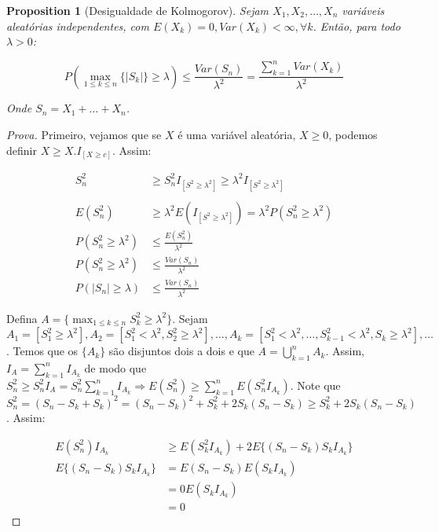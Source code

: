 \documentclass[
]{article}
\newtheorem{proposition}{Proposition}[section]
\theoremstyle{definition}
\theoremstyle{definition}
\theoremstyle{definition}
\theoremstyle{definition}
\theoremstyle{remark}
\begin{document}
\begin{proposition}[Desigualdade de Kolmogorov]
Sejam \(X_{1},X_{2},\ldots,X_{n}\) variáveis aleatórias independentes, com \(E(X_{k}) = 0, Var(X_{k}) < \infty, \forall k\). Então, para todo \(\lambda > 0\):

\begin{equation*}
P\left(\max_{1 \le k \le n}\{|S_{k}|\} \ge \lambda\right) \le \frac{Var(S_{n})}{\lambda^{2}} = \frac{\sum_{k=1}^{n}Var(X_{k})}{\lambda^{2}}
\end{equation*}

Onde \(S_{n} = X_{1} + \ldots + X_{n}\).
\end{proposition}

\begin{proof}[Prova]
Primeiro, vejamos que se \(X\) é uma variável aleatória, \(X \ge 0\), podemos definir \(X \ge X.I_{[X \ge c]}\). Assim:

\begin{align*}
S_{n}^{2} &\ge S_{n}^{2}I_{[S^{2} \ge \lambda^{2}]} \ge \lambda^{2}I_{[S^{2} \ge \lambda^{2}]} \\ \\
E(S_{n}^{2}) &\ge \lambda^{2}E(I_{[S^{2} \ge \lambda^{2}]}) = \lambda^{2}P(S_{n}^{2} \ge \lambda^{2}) \\
P(S_{n}^{2} \ge \lambda^{2}) &\le \frac{E(S_{n}^{2})}{\lambda^{2}} \\
P(S_{n}^{2} \ge \lambda^{2}) &\le \frac{Var(S_{n})}{\lambda^{2}} \\
P(|S_{n}| \ge \lambda) &\le \frac{Var(S_{n})}{\lambda^{2}}
\end{align*}

Defina \(A = \{\max_{1 \le k \le n}S_{k}^{2} \ge \lambda^{2}\}\). Sejam \(A_{1} = [S_{1}^{2} \ge \lambda^{2}], A_{2} = [S_{1}^{2} < \lambda^{2}, S_{2}^{2} \ge \lambda^{2}], \ldots, A_{k} = [S_{1}^{2} < \lambda^{2}, \ldots, S_{k-1}^{2} < \lambda^{2}, S_{k} \ge \lambda^{2}], \ldots\). Temos que os \(\{A_{k}\}\) são disjuntos dois a dois e que \(A = \bigcup_{k=1}^{n}A_{k}\). Assim, \(I_{A} = \sum_{k=1}^{n}I_{A_{k}}\) de modo que \(S_{n}^{2} \ge S_{n}^{2}I_{A} = S_{n}^{2}\sum_{k=1}^{n}I_{A_{k}} \Rightarrow E(S_{n}^{2}) \ge \sum_{k=1}^{n}E(S_{n}^{2}I_{A_{k}})\). Note que \(S_{n}^{2} = (S_{n} - S_{k} + S_{k})^{2} = (S_{n} - S_{k})^{2} + S_{k}^{2} + 2S_{k}(S_{n} - S_{k}) \ge S_{k}^{2} + 2S_{k}(S_{n} - S_{k})\). Assim:

\begin{align*}
E(S_{n}^{2})I_{A_{k}} &\ge E(S_{k}^{2}I_{A_{k}}) + 2E\{(S_{n} - S_{k})S_{k}I_{A_{k}}\} \\
E\{(S_{n} - S_{k})S_{k}I_{A_{k}}\} &= E(S_{n} - S_{k})E(S_{k}I_{A_{k}}) \\
&= 0E(S_{k}I_{A_{k}}) \\
&= 0
\end{align*}


\end{proof}
\end{document}
